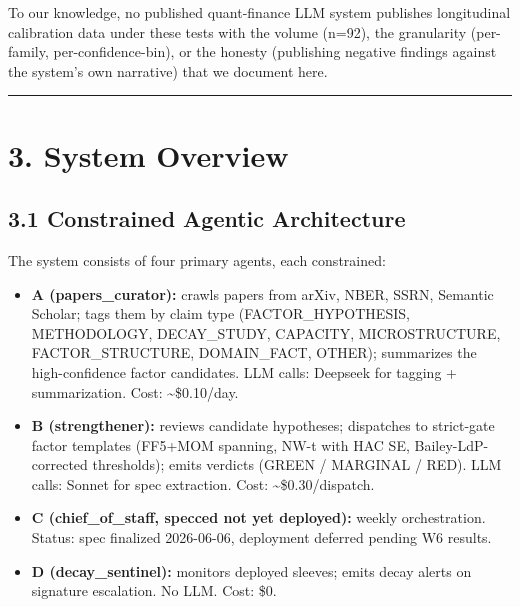 \documentclass[11pt,a4paper]{article}
\begin{document}
To our knowledge, no published quant-finance LLM system publishes longitudinal calibration data under these tests with the volume (n=92), the granularity (per-family, per-confidence-bin), or the honesty (publishing negative findings against the system's own narrative) that we document here.

\medskip\hrule\medskip

\section{3. System Overview}

\subsection{3.1 Constrained Agentic Architecture}

The system consists of four primary agents, each constrained:

\begin{itemize}[leftmargin=*]
\item \textbf{A (papers\_curator):} crawls papers from arXiv, NBER, SSRN, Semantic Scholar; tags them by claim type (FACTOR\_HYPOTHESIS, METHODOLOGY, DECAY\_STUDY, CAPACITY, MICROSTRUCTURE, FACTOR\_STRUCTURE, DOMAIN\_FACT, OTHER); summarizes the high-confidence factor candidates. LLM calls: Deepseek for tagging + summarization. Cost: \textasciitilde{}\$0.10/day.
\end{itemize}

\begin{itemize}[leftmargin=*]
\item \textbf{B (strengthener):} reviews candidate hypotheses; dispatches to strict-gate factor templates (FF5+MOM spanning, NW-t with HAC SE, Bailey-LdP-corrected thresholds); emits verdicts (GREEN / MARGINAL / RED). LLM calls: Sonnet for spec extraction. Cost: \textasciitilde{}\$0.30/dispatch.
\end{itemize}

\begin{itemize}[leftmargin=*]
\item \textbf{C (chief\_of\_staff, specced not yet deployed):} weekly orchestration. Status: spec finalized 2026-06-06, deployment deferred pending W6 results.
\end{itemize}

\begin{itemize}[leftmargin=*]
\item \textbf{D (decay\_sentinel):} monitors deployed sleeves; emits decay alerts on signature escalation. No LLM. Cost: \$0.
\end{itemize}
\end{document}
